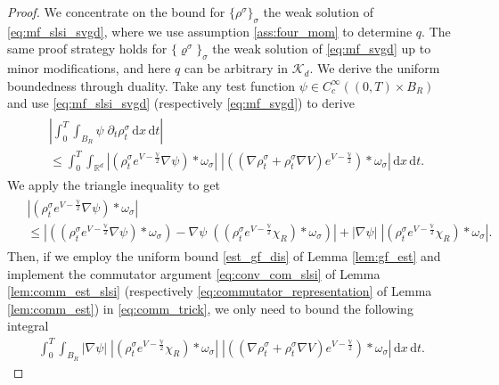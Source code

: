 \documentclass[reqno, 11pt]{amsart}
\numberwithin{equation}{section}
\theoremstyle{definition}
\begin{document}
\begin{proof}
    We concentrate on the bound for $\{\rho^\sigma\}_\sigma$ the weak solution of \eqref{eq:mf_slsi_svgd}, where we use assumption \ref{ass:four_mom} to determine $q$. The same proof strategy holds for $\{\varrho^\sigma\}_\sigma$ the weak solution of \eqref{eq:mf_svgd} up to minor modifications, and here $q$ can be arbitrary in $\mathcal{K}_d$. We derive the uniform boundedness through duality. Take any test function $\psi\in C_c^\infty((0,T)\times B_R)$ and use \eqref{eq:mf_slsi_svgd} (respectively \eqref{eq:mf_svgd}) to derive
    \begin{align}
        \label{eq:test_on_mf_svgd}
        \begin{split}
            &\left\vert\int_0^T \int_{B_R} \psi\;\partial_t\rho_t^\sigma\,\mathrm{d} x\,\mathrm{d} t\right\vert\\
            &\leq\int_0^T \int_{\mathbb{R}^{d}}|(\rho_t^\sigma e^{V-\frac{\mathbb{V}}{2}}\nabla \psi)\ast\omega_\sigma|\; |((\nabla \rho_t^\sigma+\rho_t^\sigma \nabla V)e^{V-\frac{\mathbb{V}}{2}})\ast\omega_\sigma|\,\mathrm{d} x\,\mathrm{d} t.
        \end{split}
    \end{align}
    We apply the triangle inequality to get
    \begin{align}
        \label{eq:comm_trick}
        \begin{split}
            &|(\rho_t^\sigma e^{V-\frac{\mathbb{V}}{2}}\nabla \psi)\ast\omega_\sigma|\\
            &\leq |((\rho_t^\sigma e^{V-\frac{\mathbb{V}}{2}}\nabla \psi)\ast\omega_\sigma)-\nabla \psi\;((\rho_t^\sigma e^{V-\frac{\mathbb{V}}{2}}\chi_R)\ast\omega_\sigma)|
            +|\nabla\psi|\;|(\rho_t^\sigma e^{V-\frac{\mathbb{V}}{2}}\chi_R)\ast\omega_\sigma|.
        \end{split}
    \end{align}
    Then, if we employ the uniform bound \ref{est_gf_dis} of Lemma \ref{lem:gf_est} and implement the commutator argument \eqref{eq:conv_com_slsi} of Lemma \ref{lem:comm_est_slsi} (respectively \eqref{eq:commutator_representation} of Lemma \ref{lem:comm_est}) in \eqref{eq:comm_trick}, we only need to bound the following integral
    \begin{align}
        \label{eq:test_on_mf_svgd_better}
        \int_0^T \int_{B_R}|\nabla \psi|\;|(\rho_t^\sigma e^{V-\frac{\mathbb{V}}{2}}\chi_R)\ast\omega_\sigma|\; |((\nabla \rho_t^\sigma+\rho_t^\sigma \nabla V)e^{V-\frac{\mathbb{V}}{2}})\ast\omega_\sigma|\,\mathrm{d} x\,\mathrm{d} t.

\end{align}
\end{proof}
\end{document}
